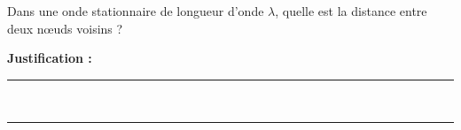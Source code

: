 Dans une onde stationnaire de longueur d'onde $\lambda$, quelle est la distance entre deux nœuds voisins ?

\choices

\noindent\textbf{Justification :} \hrulefill \\[2.5ex]
\rule{\linewidth}{0.4pt} \\[2.5ex]
\rule{\linewidth}{0.4pt}
\vfill
